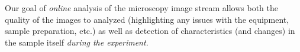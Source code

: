 \documentclass[conference]{IEEEtran}
\begin{document}
Our goal of \emph{online} analysis of the microscopy image stream allows both the quality of the images to analyzed (highlighting any issues with the equipment, sample preparation, etc.) as well as detection of characteristics (and changes) in the sample itself \emph{during the experiment}. 
\end{document}
